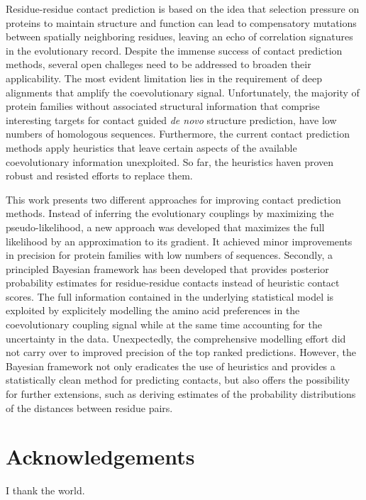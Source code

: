 \documentclass[11pt,a4paper,twoside]{book}
\theoremstyle{definition}
\theoremstyle{definition}
\theoremstyle{remark}
\begin{document}
Residue-residue contact prediction is based on the idea that selection
pressure on proteins to maintain structure and function can lead to
compensatory mutations between spatially neighboring residues, leaving
an echo of correlation signatures in the evolutionary record. Despite
the immense success of contact prediction methods, several open
challeges need to be addressed to broaden their applicability. The most
evident limitation lies in the requirement of deep alignments that
amplify the coevolutionary signal. Unfortunately, the majority of
protein families without associated structural information that comprise
interesting targets for contact guided \emph{de novo} structure
prediction, have low numbers of homologous sequences. Furthermore, the
current contact prediction methods apply heuristics that leave certain
aspects of the available coevolutionary information unexploited. So far,
the heuristics haven proven robust and resisted efforts to replace them.

This work presents two different approaches for improving contact
prediction methods. Instead of inferring the evolutionary couplings by
maximizing the pseudo-likelihood, a new approach was developed that
maximizes the full likelihood by an approximation to its gradient. It
achieved minor improvements in precision for protein families with low
numbers of sequences. Secondly, a principled Bayesian framework has been
developed that provides posterior probability estimates for
residue-residue contacts instead of heuristic contact scores. The full
information contained in the underlying statistical model is exploited
by explicitely modelling the amino acid preferences in the
coevolutionary coupling signal while at the same time accounting for the
uncertainty in the data. Unexpectedly, the comprehensive modelling
effort did not carry over to improved precision of the top ranked
predictions. However, the Bayesian framework not only eradicates the use
of heuristics and provides a statistically clean method for predicting
contacts, but also offers the possibility for further extensions, such
as deriving estimates of the probability distributions of the distances
between residue pairs.

\chapter*{Acknowledgements}\label{acknowledgements}

I thank the world.
\end{document}
